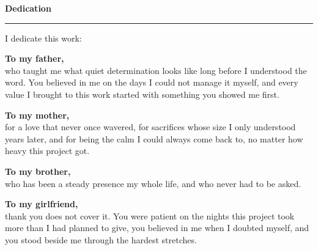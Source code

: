 
\thispagestyle{empty}

\vspace*{0cm}   %

{\noindent\Huge\sffamily\bfseries Dedication\par}

\vspace{0.35cm}
\noindent\textcolor{myblue}{\rule{\textwidth}{1.4pt}}

\vspace{1.2cm}


\noindent I dedicate this work:

\vspace{0.6cm}

\noindent\textbf{To my father,}\\
who taught me what quiet determination looks like long before I understood
the word. You believed in me on the days I could not manage it myself, and
every value I brought to this work started with something you showed me first.

\vspace{0.5cm}

\noindent\textbf{To my mother,}\\
for a love that never once wavered, for sacrifices whose size I only
understood years later, and for being the calm I could always come back to,
no matter how heavy this project got.

\vspace{0.5cm}

\noindent\textbf{To my brother,}\\
who has been a steady presence my whole life, and who never had to be asked.

\vspace{0.5cm}

\noindent\textbf{To my girlfriend,}\\
thank you does not cover it. You were patient on the nights this project took
more than I had planned to give, you believed in me when I doubted myself, and
you stood beside me through the hardest stretches.

